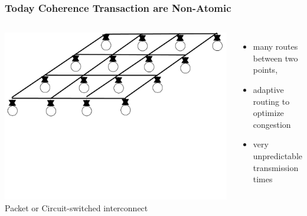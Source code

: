 \documentclass{beamer}
\begin{document}
\begin{frame}[fragile,t]
\frametitle{Today Coherence Transaction are Non-Atomic}

\begin{columns}
\vspace{+7ex}
\includegraphics[width=22ex]{Ch7Figs/Mesh}\pause
{}
Packet or Circuit-switched interconnect
\begin{itemize}
    \item many routes between two points,
    \item adaptive routing to optimize congestion
    \item very unpredictable transmission times
\end{itemize}
\end{columns}

\end{frame}
\end{document}
